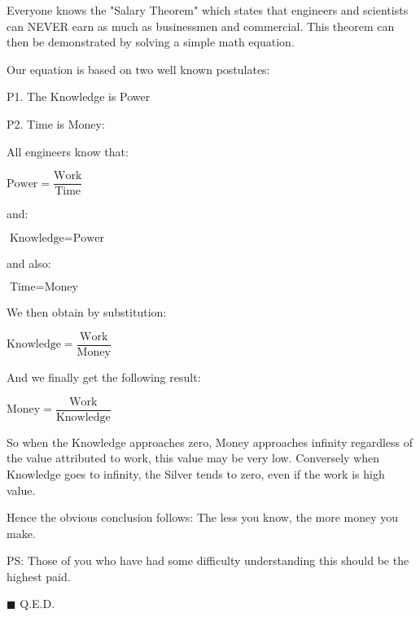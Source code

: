 Everyone knows the "Salary Theorem" which states that engineers and scientists can NEVER earn as much as businessmen and commercial. This theorem can then be demonstrated by solving a simple math equation.

Our equation is based on two well known postulates:

P1. The Knowledge is Power

P2. Time is Money:

All engineers know that:

\begin{center}
$\text{Power}=\dfrac{\text{Work}}{\text{Time}}$
\end{center}

and:

\begin{center}
$\text{Knowledge}=\text{Power}$
\end{center}

and also:

\begin{center}
$\text{Time}=\text{Money}$
\end{center}

We then obtain by substitution: 

\begin{center}
$\text{Knowledge}=\dfrac{\text{Work}}{\text{Money}}$
\end{center}

And we finally get the following result: 

\begin{center}
$\text{Money}=\dfrac{\text{Work}}{\text{Knowledge}}$
\end{center}

So when the Knowledge approaches zero, Money approaches infinity regardless of the value attributed to work, this value may be very low. Conversely when Knowledge goes to infinity, the Silver tends to zero, even if the work is high value.

Hence the obvious conclusion follows: The less you know, the more money you make.

PS: Those of you who have had some difficulty understanding this should be the highest paid.

	\begin{flushright}
		$\blacksquare$  Q.E.D.
	\end{flushright}
	\begin{center}\underline{\hspace{5 cm}}\end{center}
	
